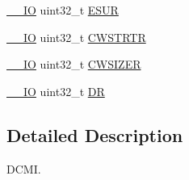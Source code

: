 \begin{DoxyCompactItemize}
\hyperlink{group___c_m_s_i_s__core__definitions_gaec43007d9998a0a0e01faede4133d6be}{\-\_\-\-\_\-\-I\-O} uint32\-\_\-t \hyperlink{struct_d_c_m_i___type_def_af00a94620e33f4eff74430ff25c12b94}{E\-S\-U\-R}
\item 
\hyperlink{group___c_m_s_i_s__core__definitions_gaec43007d9998a0a0e01faede4133d6be}{\-\_\-\-\_\-\-I\-O} uint32\-\_\-t \hyperlink{struct_d_c_m_i___type_def_a4d58830323e567117c12ae3feac613b9}{C\-W\-S\-T\-R\-T\-R}
\item 
\hyperlink{group___c_m_s_i_s__core__definitions_gaec43007d9998a0a0e01faede4133d6be}{\-\_\-\-\_\-\-I\-O} uint32\-\_\-t \hyperlink{struct_d_c_m_i___type_def_a1b9c8048339e19b110ecfbea486f55df}{C\-W\-S\-I\-Z\-E\-R}
\item 
\hyperlink{group___c_m_s_i_s__core__definitions_gaec43007d9998a0a0e01faede4133d6be}{\-\_\-\-\_\-\-I\-O} uint32\-\_\-t \hyperlink{struct_d_c_m_i___type_def_a266cec1031b0be730b0e35523f5e2934}{D\-R}
\end{DoxyCompactItemize}


\subsection{Detailed Description}
D\-C\-M\-I. 

